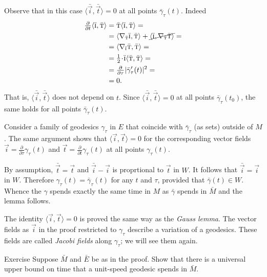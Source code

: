 Observe that in this case $\langle\bar{\vec i},\bar{\vec t}\rangle=0$ at all points $\bar\gamma_\tau(t)$.
Indeed 
\begin{align*}
\tfrac{\partial}{\partial t}\langle\bar{\vec i},\bar{\vec t}\rangle&=
\bar{\vec t}\langle\bar{\vec i},\bar{\vec t}\rangle=
\\
&=
\langle\nabla_{\bar{\vec t}}\bar{\vec i},\bar{\vec t}\rangle+\cancel{\langle\bar{\vec i},\nabla_{\bar{\vec t}}\bar{\vec t}\rangle}=
\\
&=\langle\nabla_{\bar{\vec i}}\bar{\vec t},\bar{\vec t}\rangle=
\\
&=\tfrac12\cdot\bar{\vec i}\langle\bar{\vec t},\bar{\vec t}\rangle=
\\
&=\tfrac{\partial}{\partial \tau}|\bar\gamma_\tau'(t)|^2=
\\
&=0.
\end{align*}
That is, $\langle\bar{\vec i},\bar{\vec t}\rangle$ does not depend on $t$.
Since $\langle\bar{\vec i},\bar{\vec t}\rangle=0$ at all points $\bar\gamma_\tau(t_0)$, the same holds for all points  $\bar\gamma_\tau(t)$.

Consider a family of geodesics $\gamma_\tau$ in $E$ that coincide with $\bar\gamma_\tau$ (as sets) outside of $M$.
The same argument shows that $\langle\vec i,\vec t\rangle=0$ for the corresponding vector fields ${\vec i}
=\tfrac{\partial}{\partial\tau}\gamma_\tau(t)$ and $\vec t
=\tfrac{\partial}{\partial t}\gamma_\tau(t)$
at all points $\gamma_\tau(t)$.

By assumption, $\bar{\vec t}=\vec t$ and
$\bar{\vec i}-\vec i$ is proprtional to $\vec t$ in $W$.
It follows that $\bar{\vec i}=\vec i$ in $W$.
Therefore $\gamma_\tau(t)=\bar\gamma_\tau(t)$ for any $t$ and $\tau$, provided that $\bar\gamma(t)\in W$.
Whence the $\gamma$ spends exactly the same time in $M$ as 
$\bar \gamma$ spends in $\bar M$ and the lemma follows.\qeds

The identity $\langle\vec i,\vec t\rangle=0$ is proved the same way as the \emph{Gauss lemma}.
The vector fields as $\vec i$ in the proof restricted to $\gamma_\tau$ describe a variation of a geodesics.
These fields are called \emph{Jacobi fields} along $\gamma_\tau$;
we will see them again.

\begin{thm}{Exercise}\label{ex:exit-time}
Suppose $\bar M$ and $\bar E$ be as in the proof.
Show that there is a universal upper bound on time that a unit-speed geodesic spends in $\bar M$.
\end{thm}

